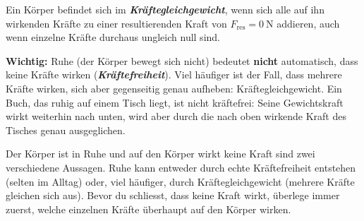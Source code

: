 \documentclass[addpoints,11pt,a4paper]{exam}
\begin{document}
\begin{theoriebox}[Kräftegleichgewicht]
Ein Körper befindet sich im \textbf{\emph{Kräftegleichgewicht}}, wenn
sich alle auf ihn wirkenden Kräfte zu einer resultierenden Kraft von
$F_{\text{res}}=\SI{0}{\newton}$ addieren, auch wenn einzelne Kräfte
durchaus ungleich null sind.

\textbf{Wichtig:} Ruhe (der Körper bewegt sich nicht) bedeutet
\textbf{nicht} automatisch, dass keine Kräfte wirken
(\textbf{\emph{Kräftefreiheit}}). Viel häufiger ist der Fall, dass
mehrere Kräfte wirken, sich aber gegenseitig genau aufheben:
Kräftegleichgewicht. Ein Buch, das ruhig auf einem Tisch liegt, ist nicht
kräftefrei: Seine Gewichtskraft wirkt weiterhin nach unten, wird aber
durch die nach oben wirkende Kraft des Tisches genau ausgeglichen.
\end{theoriebox}

\begin{hinweisbox}
\glqq Der Körper ist in Ruhe\grqq{} und \glqq auf den Körper wirkt keine
Kraft\grqq{} sind zwei verschiedene Aussagen. Ruhe kann entweder durch
echte Kräftefreiheit entstehen (selten im Alltag) oder, viel häufiger,
durch Kräftegleichgewicht (mehrere Kräfte gleichen sich aus). Bevor du
schliesst, dass \glqq keine Kraft wirkt\grqq{}, überlege immer zuerst,
welche einzelnen Kräfte überhaupt auf den Körper wirken.
\end{hinweisbox}
\end{document}
